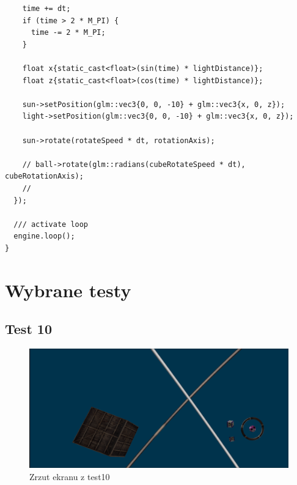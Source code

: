 \documentclass[11pt]{article}
\begin{document}
\begin{verbatim}
    time += dt;
    if (time > 2 * M_PI) {
      time -= 2 * M_PI;
    }

    float x{static_cast<float>(sin(time) * lightDistance)};
    float z{static_cast<float>(cos(time) * lightDistance)};

    sun->setPosition(glm::vec3{0, 0, -10} + glm::vec3{x, 0, z});
    light->setPosition(glm::vec3{0, 0, -10} + glm::vec3{x, 0, z});

    sun->rotate(rotateSpeed * dt, rotationAxis);

    // ball->rotate(glm::radians(cubeRotateSpeed * dt), cubeRotationAxis);
    //
  });

  /// activate loop
  engine.loop();
}
\end{verbatim}
\section{Wybrane testy}
\label{sec:org3794488}
\subsection{Test 10}
\label{sec:orgebba117}

\begin{figure}[htbp]
\centering
\includegraphics[width=.9\linewidth]{img/test10.png}
\caption{Zrzut ekranu z test10}
\end{figure}
\end{document}
